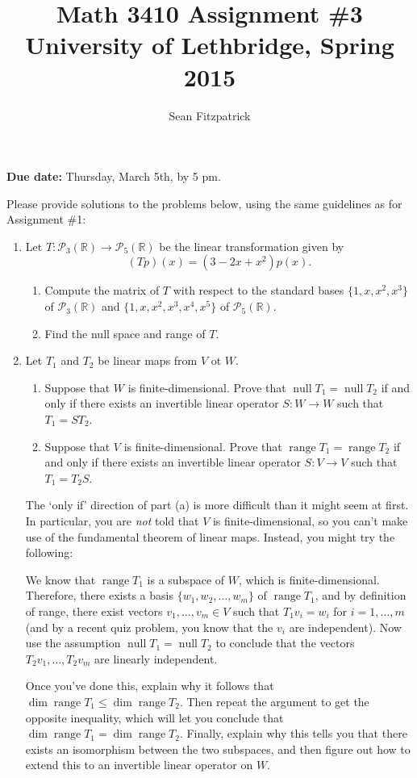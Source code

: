 \documentclass[letterpaper,12pt]{article}
\title{Math 3410 Assignment \#3\\University of Lethbridge, Spring 2015}
\author{Sean Fitzpatrick}
\newcommand{\R}{\mathbb{R}}
\renewcommand{\P}{\mathcal{P}}
\DeclareMathOperator{\nul}{null}
\DeclareMathOperator{\range}{range}
\begin{document}
 \maketitle

{\bf Due date:} Thursday, March 5th, by 5 pm.

\bigskip

Please provide solutions to the problems below, using the same guidelines as for Assignment \#1:


\begin{enumerate}
 \item Let $T:\P_3(\R)\to\P_5(\R)$ be the linear transformation given by
\[
 (Tp)(x) = (3-2x+x^2)p(x).
\]
\begin{enumerate}
 \item Compute the matrix of $T$ with respect to the standard bases $\{1,x,x^2,x^3\}$ of $\P_3(\R)$ and $\{1,x,x^2,x^3,x^4,x^5\}$ of $\P_5(\R)$.
 \item Find the null space and range of $T$.
\end{enumerate}
 \item Let $T_1$ and $T_2$ be linear maps from $V$ ot $W$.
\begin{enumerate}
 \item Suppose that $W$ is finite-dimensional. Prove that $\nul T_1=\nul T_2$ if and only if there exists an invertible linear operator $S:W\to W$ such that $T_1=ST_2$.
 \item Suppose that $V$ is finite-dimensional. Prove that $\range T_1=\range T_2$ if and only if there exists an invertible linear operator $S:V\to V$ such that $T_1=T_2S$.
\end{enumerate}
 The `only if' direction of part (a) is more difficult than it might seem at first. In particular, you are {\em not} told that $V$ is finite-dimensional, so you can't make use of the fundamental theorem of linear maps. Instead, you might try the following:

We know that $\range T_1$ is a subspace of $W$, which is finite-dimensional. Therefore, there exists a basis $\{w_1,w_2,\ldots, w_m\}$ of $\range T_1$, and by definition of range, there exist vectors $v_1,\ldots, v_m\in V$ such that $T_1v_i = w_i$ for $i=1,\ldots, m$ (and by a recent quiz problem, you know that the $v_i$ are independent). Now use the assumption $\nul T_1=\nul T_2$ to conclude that the vectors $T_2v_1, \ldots, T_2v_m$ are linearly independent.

Once you've done this, explain why it follows that $\dim \range T_1\leq \dim \range T_2$. Then repeat the argument to get the opposite inequality, which will let you conclude that $\dim \range T_1 = \dim \range T_2$. Finally, explain why this tells you that there exists an isomorphism between the two subspaces, and then figure out how to extend this to an invertible linear operator on $W$.


\end{enumerate}
\end{document}

